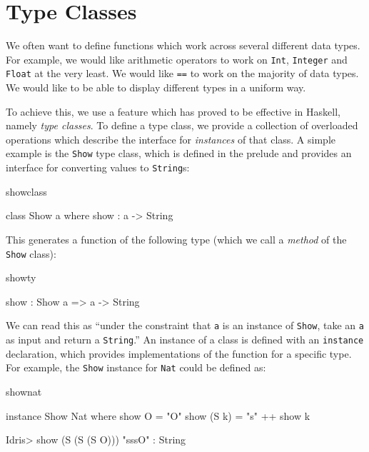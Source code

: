 \section{Type Classes}
\label{sec:classes}

We often want to define functions which work across several different data
types. For example, we would like arithmetic operators to work on \texttt{Int},
\texttt{Integer} and \texttt{Float} at the very least. We would like
\texttt{==} to work on the majority of data types. We would like to be able to
display different types in a uniform way.

To achieve this, we use a feature which has proved to be effective in Haskell, namely
\emph{type classes}. To define a type class, we provide a collection of overloaded
operations which describe the interface for \emph{instances} of that class. A simple example
is the \texttt{Show} type class, which is defined in the prelude and
provides an interface for converting values to
\texttt{String}s:

\begin{SaveVerbatim}{showclass}

class Show a where
    show : a -> String

\end{SaveVerbatim}

\noindent
This generates a function of the following type (which we call a \emph{method} of the 
\texttt{Show} class):

\begin{SaveVerbatim}{showty}

show : Show a => a -> String

\end{SaveVerbatim}

\noindent
We can read this as ``under the constraint that \texttt{a} is an instance of \texttt{Show},
take an \texttt{a} as input and return a \texttt{String}.'' An instance of a class
is defined with an \texttt{instance} declaration, which provides implementations of
the function for a specific type. For example, the \texttt{Show} instance for \texttt{Nat}
could be defined as:

\begin{SaveVerbatim}{shownat}

instance Show Nat where
    show O = "O"
    show (S k) = "s" ++ show k

Idris> show (S (S (S O))) 
"sssO" : String

\end{SaveVerbatim}

